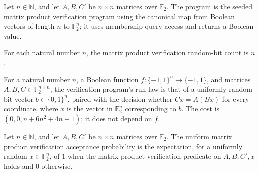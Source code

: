 \begin{definition}
\label{FABL.matrixProductVerificationProgram}
\leanok
{}
Let $n\in\mathbb{N}$, and let $A,B,C'$ be $n\times n$ matrices over $\mathbb{F}_2$. The
program is the seeded matrix product verification program using the canonical map from
Boolean vectors of length $n$ to $\mathbb{F}_2^n$; it uses membership-query access and
returns a Boolean value.
\end{definition}

\begin{definition}
\label{FABL.matrixProductVerificationRandomBits}
\leanok
For each natural number $n$, the matrix product verification random-bit count is $n$.
\end{definition}

\begin{theorem}
\label{FABL.runWithCost_matrixProductVerificationProgram}
\leanok
{}
For a natural number $n$, a Boolean function $f:\{−1,1\}^n\to\{−1,1\}$, and matrices
$A,B,C\in\mathbb F_2^{n\times n}$, the verification program’s run law is that of a
uniformly random bit vector $b\in\{0,1\}^n$, paired with the decision whether $Cx=
A(Bx)$ for every coordinate, where $x$ is the vector in $\mathbb F_2^n$ corresponding to
$b$. The cost is $(0,0,n+6n^2+4n+1)$; it does not depend on $f$.
\end{theorem}

\begin{definition}
\label{FABL.uniformMatrixProductVerificationAcceptanceProbability}
\leanok
{}
Let $n\in\mathbb{N}$, and let $A,B,C'$ be $n\times n$ matrices over $\mathbb{F}_2$. The
uniform matrix product verification acceptance probability is the expectation, for a
uniformly random $x\in\mathbb{F}_2^n$, of $1$ when the matrix product verification
predicate on $A,B,C',x$ holds and $0$ otherwise.
\end{definition}

